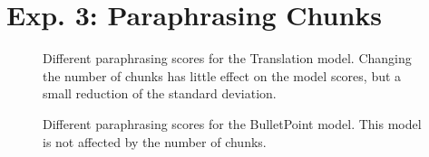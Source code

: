 \section{Exp. 3: Paraphrasing Chunks}
\label{sec:app_chunks}

\begin{figure}[H]
    \centering
    
    \caption{Different paraphrasing scores for the Translation model. 
    Changing the number of chunks has little effect on the model scores, but a small reduction of the standard deviation.}
    \label{fig:abl_chunks_gutenberg_translation}
\end{figure}

\begin{figure}[H]
    \centering
    
    \caption{Different paraphrasing scores for the BulletPoint model. 
    This model is not affected by the number of chunks.}
    \label{fig:abl_chunks_student_essays_task}
\end{figure}